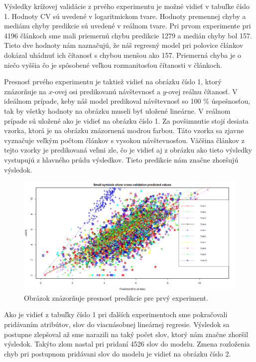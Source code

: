 \documentclass[runningheads,a4paper]{llncs}
\begin{document}
Výsledky krížovej validácie z prvého experimentu je možné vidieť v tabuľke číslo 1. Hodnoty CV sú uvedené v logaritmickom tvare. Hodnoty premennej chyby a mediánu chyby predikcie sú uvedené v reálnom tvare. Pri prvom experimente pri 4196 článkoch sme mali priemernú chybu predikcie 1279 a medián chyby bol 157. Tieto dve hodnoty nám naznačujú, že náš regresný model pri polovice článkov dokázal uhádnuť ich čítanosť s chybou menšou ako 157. Priemerná chyba je o niečo vyššia čo je spôsobené veľkou rozmanitosťou čítanosti v článkoch.

Presnosť prvého experimentu je taktiež vidieť na obrázku číslo 1, ktorý znázorňuje na $x$-ovej osi predikovanú návštevnosť a $y$-ovej reálnu čítanosť. V ideálnom prípade, keby náš model predikoval návštevnosť so 100 \% úspešnosťou, tak by všetky hodnoty na obrázku museli byť uložené lineárne. V reálnom prípade sú uložené ako je vidieť na obrázku číslo 1. Za povšimnutie stojí desiata vzorka, ktorá je na obrázku znázornená modrou farbou. Táto vzorka sa zjavne vyznačuje veľkým počtom článkov s vysokou návštevnosťou. Väčšina článkov z tejto vzorky je predikovaná veľmi zle, čo je vidieť aj z obrázku ako tieto výsledky vystupujú z hlavného prúdu výsledkov. Tieto predikcie nám značne zhoršujú výsledok.  
  
                 
\begin{figure}[h!]
  \centering  
      \includegraphics[width=1.0\textwidth]{plot3.png}
  \caption{Obrázok znázorňuje presnosť predikcie pre prvý experiment.}
\end{figure}

Ako je vidieť z tabuľky číslo 1 pri ďalších experimentoch sme pokračovali pridávaním atribútov, slov do viacnásobnej lineárnej regresie. Výsledok sa postupne zlepšoval až sme narazili na taký počet slov, ktorý nám značne zhoršil výsledok. Takýto zlom nastal pri pridaní 4526 slov do modelu. Zmena rozloženia chyb pri postupnom pridávani slov do modelu je vidieť na obrázku číslo 2.
\end{document}
